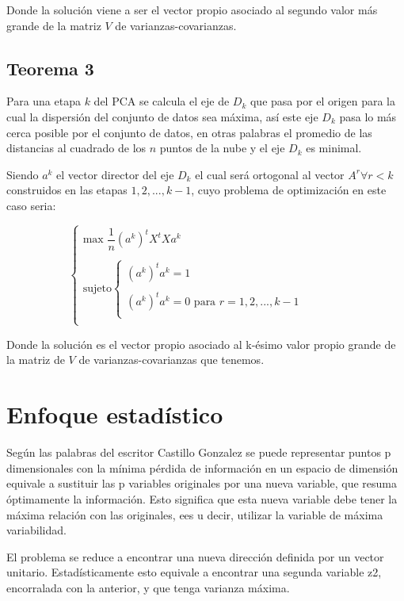Donde la solución viene a ser el vector propio asociado al segundo valor más grande de la matriz $V$ de varianzas-covarianzas.


\subsection{Teorema 3}

Para una etapa $k$ del PCA se calcula el eje de $D_k$ que pasa por el origen para la cual la dispersión del conjunto de datos sea máxima, así este eje $D_k$ pasa lo más cerca posible por el conjunto de datos, en otras palabras el promedio de las distancias al cuadrado de los $n$ puntos de la nube y el
eje $D_k$ es minimal.

Siendo $a^k$ el vector director del eje $D_k$ el cual será ortogonal al vector $A^r \forall r < k$ construidos en las etapas $1,2,...,k-1$, cuyo problema de optimización en este caso seria:

\[\left\{ \begin{array}{rcl}
\mbox{max  } \dfrac{1}{n} (a^k)^tX^tXa^k \\
& & \\
\mbox{sujeto}\left\{ \begin{array}{rcl}
(a^k)^ta^k=1 \\
& & \\
(a^k)^ta^k=0 \mbox{ para } r=1,2,...,k-1\\
\end{array}
\right.  \\
\end{array}
\right. \]

Donde la solución es el vector propio asociado al k-ésimo valor propio grande de la matriz de $V $ de varianzas-covarianzas que tenemos.

\section{Enfoque estadístico}
 \label{Enfoque estadístico}
  
Según las palabras del escritor Castillo Gonzalez se puede representar puntos p dimensionales con la mínima pérdida de información en un espacio de dimensión equivale a sustituir las p variables originales por una nueva variable, que resuma óptimamente la información. Esto significa que esta nueva variable debe tener la máxima relación con las originales, ees u decir, utilizar la variable de máxima variabilidad. \cite{CastilloGonzalez} 
  
El problema se reduce a encontrar una nueva dirección definida por
un vector unitario. Estadísticamente esto equivale a encontrar una segunda variable z2, encorralada con la anterior, y que tenga varianza
máxima.  
  
